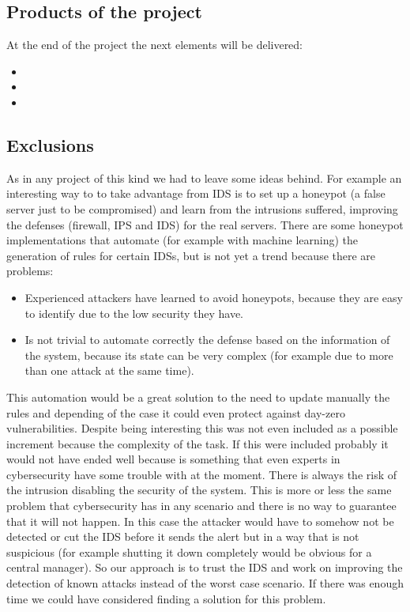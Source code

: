 \subsection{Products of the project}
At the end of the project the next elements will be delivered:
\begin{itemize}
	\item 
	\item 
	\item 
\end{itemize}



\subsection{Exclusions} 	%
As in any project of this kind we had to leave some ideas behind.
\linej
\linej
For example an interesting way to to take advantage from IDS is to set up a honeypot (a false server just to be compromised) and learn from the intrusions suffered, improving the defenses (firewall, IPS and IDS) for the real servers. There are some honeypot implementations that automate (for example with machine learning) the generation of rules for certain IDSs, but is not yet a trend because there are problems\cite{snort_learning}\cite{honeypot_weka_learning}\cite{honeypot_ossec_trees}\cite{snort_honeypot}:
\begin{itemize}
	\item Experienced attackers have learned to avoid honeypots, because they are easy to identify due to the low security they have.
	\item Is not trivial to automate correctly the defense based on the information of the system, because its state can be very complex (for example due to more than one attack at the same time).
\end{itemize}
\linej
This automation would be a great solution to the need to update manually the rules and depending of the case it could even protect against day-zero vulnerabilities. Despite being interesting this was not even included as a possible increment because the complexity of the task. If this were included probably it would not have ended well because is something that even experts in cybersecurity have some trouble with at the moment.
\linej
\linej
There is always the risk of the intrusion disabling the security of the system. This is more or less the same problem that cybersecurity has in any scenario and there is no way to guarantee that it will not happen. In this case the attacker would have to somehow not be detected or cut the IDS before it sends the alert but in a way that is not suspicious (for example shutting it down completely would be obvious for a central manager). So our approach is to trust the IDS and work on improving the detection of known attacks instead of the worst case scenario. If there was enough time we could have considered finding a solution for this problem.
